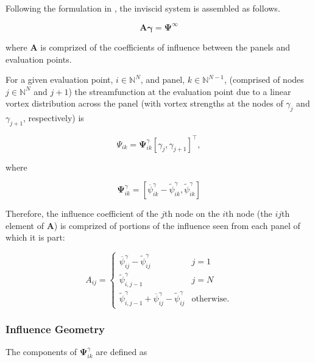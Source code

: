 \documentclass[]{article}
\begin{document}
Following the formulation in \cite{fidkowski_coupled_2022}, the inviscid system is assembled as follows.

\begin{equation}
	\mathbf{A} \mathbf{\gamma} = \mathbf{\Psi}^\infty
\end{equation}

\noindent where \(\mathbf{A}\) is comprized of the coefficients of influence between the panels and evaluation points.

For a given evaluation point, \(i \in \mathbb{N}^N\), and panel, \(k \in \mathbb{N}^{N-1}\), (comprised of nodes \(j \in \mathbb{N}^N\) and \(j+1\)) the streamfunction at the evaluation point due to a linear vortex distribution across the panel (with vortex strengths at the nodes of \(\gamma_j\) and \(\gamma_{j+1}\), respectively) is

\begin{equation}
	\Psi_{ik} = \mathbf{\Psi}^\gamma_{ik} [\gamma_j, \gamma_{j+1}]^\top,
\end{equation}

\noindent where

\begin{equation}
	\mathbf{\Psi}^\gamma_{ik} = [\overline{\psi}^\gamma_{ik} - \widetilde{\psi}^\gamma_{ik}, \widetilde{\psi}^\gamma_{ik}]
\end{equation}

\noindent Therefore, the influence coefficient of the \(j\)th node on the \(i\)th node (the \(ij\)th element of \(\mathbf{A}\)) is comprized of portions of the influence seen from each panel of which it is part:

\begin{equation}
	A_{ij} = \begin{cases}
		\overline{\psi}^\gamma_{ij} -  \widetilde{\psi}^\gamma_{ij} & j = 1 \\
		\widetilde{\psi}^\gamma_{i,j-1} & j = N \\
		\widetilde{\psi}^\gamma_{i,j-1} + \overline{\psi}^\gamma_{ij} -  \widetilde{\psi}^\gamma_{ij} & \mathrm{otherwise}.
	\end{cases}
\end{equation}

\subsubsection{Influence Geometry}

The components of \(\mathbf{\Psi}^\gamma_{ik}\) are defined as 
\end{document}
